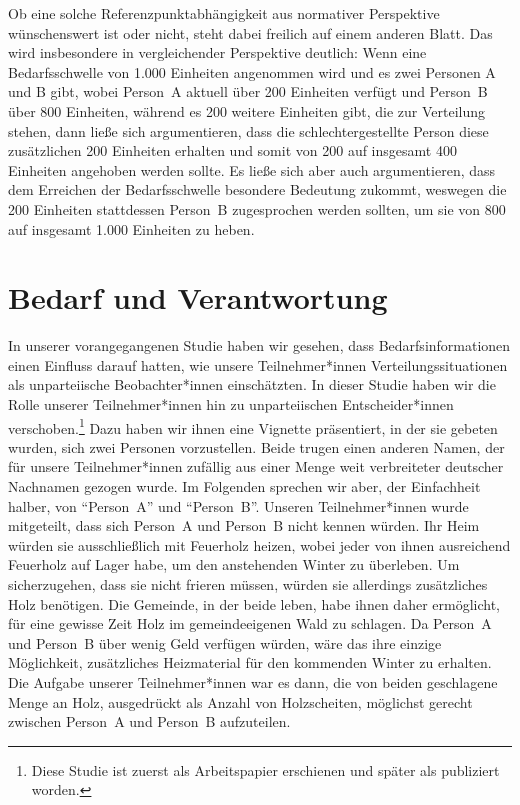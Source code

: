 \documentclass[justified,nobib,symmetric,twoside]{tufte-handout}
\begin{document}
Ob eine solche Referenzpunktabhängigkeit aus normativer Perspektive wünschenswert ist oder nicht, steht dabei freilich auf einem anderen Blatt.
Das wird insbesondere in vergleichender Perspektive deutlich: Wenn eine Bedarfsschwelle von 1.000 Einheiten angenommen wird und es zwei Personen A und B gibt, wobei Person~A aktuell über 200 Einheiten verfügt und Person~B über 800 Einheiten, während es 200 weitere Einheiten gibt, die zur Verteilung stehen, dann ließe sich argumentieren, dass die schlechtergestellte Person diese zusätzlichen 200 Einheiten erhalten und somit von 200 auf insgesamt 400 Einheiten angehoben werden sollte.
Es ließe sich aber auch argumentieren, dass dem Erreichen der Bedarfsschwelle besondere Bedeutung zukommt, weswegen die 200 Einheiten stattdessen Person~B zugesprochen werden sollten, um sie von 800 auf insgesamt 1.000 Einheiten zu heben.


\section{Bedarf und Verantwortung}\label{sec:verantwortung}
In unserer vorangegangenen Studie haben wir gesehen, dass Bedarfsinformationen einen Einfluss darauf hatten, wie unsere Teilnehmer*innen Verteilungssituationen als unparteiische Beobachter*innen einschätzten.
In dieser Studie haben wir die Rolle unserer Teilnehmer*innen hin zu unparteiischen Entscheider*innen verschoben.\footnote[][-0.7cm]{Diese Studie ist zuerst als Arbeitspapier erschienen \citep{bauer_need_2020} und später als \citet{bauer_need_2022} publiziert worden.}
Dazu haben wir ihnen eine Vignette präsentiert, in der sie gebeten wurden, sich zwei Personen vorzustellen.
Beide trugen einen anderen Namen, der für unsere Teilnehmer*innen zufällig aus einer Menge weit verbreiteter deutscher Nachnamen gezogen wurde.
Im Folgenden sprechen wir aber, der Einfachheit halber, von \enquote{Person~A} und \enquote{Person~B}.
Unseren Teilnehmer*innen wurde mitgeteilt, dass sich Person~A und Person~B nicht kennen würden.
Ihr Heim würden sie ausschließlich mit Feuerholz heizen, wobei jeder von ihnen ausreichend Feuerholz auf Lager habe, um den anstehenden Winter zu überleben.
Um sicherzugehen, dass sie nicht frieren müssen, würden sie allerdings zusätzliches Holz benötigen.
Die Gemeinde, in der beide leben, habe ihnen daher ermöglicht, für eine gewisse Zeit Holz im gemeindeeigenen Wald zu schlagen.
Da Person~A und Person~B über wenig Geld verfügen würden, wäre das ihre einzige Möglichkeit, zusätzliches Heizmaterial für den kommenden Winter zu erhalten.
Die Aufgabe unserer Teilnehmer*innen war es dann, die von beiden geschlagene Menge an Holz, ausgedrückt als Anzahl von Holzscheiten, möglichst gerecht zwischen Person~A und Person~B aufzuteilen.
\end{document}
